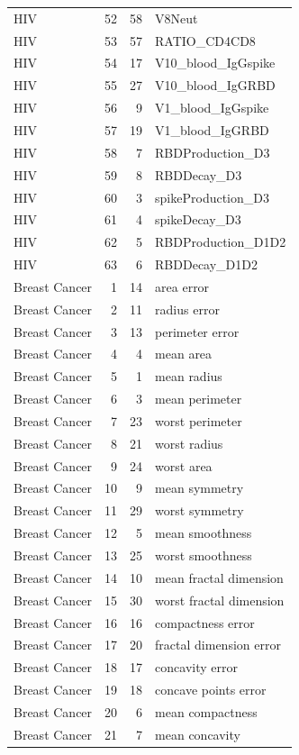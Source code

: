 \begin{longtable}{lrrp{}}
HIV & 52 & 58 & V8Neut \\
HIV & 53 & 57 & RATIO\_CD4CD8 \\
HIV & 54 & 17 & V10\_blood\_IgGspike \\
HIV & 55 & 27 & V10\_blood\_IgGRBD \\
HIV & 56 & 9 & V1\_blood\_IgGspike \\
HIV & 57 & 19 & V1\_blood\_IgGRBD \\
HIV & 58 & 7 & RBDProduction\_D3 \\
HIV & 59 & 8 & RBDDecay\_D3 \\
HIV & 60 & 3 & spikeProduction\_D3 \\
HIV & 61 & 4 & spikeDecay\_D3 \\
HIV & 62 & 5 & RBDProduction\_D1D2 \\
HIV & 63 & 6 & RBDDecay\_D1D2 \\
Breast Cancer & 1 & 14 & area error \\
Breast Cancer & 2 & 11 & radius error \\
Breast Cancer & 3 & 13 & perimeter error \\
Breast Cancer & 4 & 4 & mean area \\
Breast Cancer & 5 & 1 & mean radius \\
Breast Cancer & 6 & 3 & mean perimeter \\
Breast Cancer & 7 & 23 & worst perimeter \\
Breast Cancer & 8 & 21 & worst radius \\
Breast Cancer & 9 & 24 & worst area \\
Breast Cancer & 10 & 9 & mean symmetry \\
Breast Cancer & 11 & 29 & worst symmetry \\
Breast Cancer & 12 & 5 & mean smoothness \\
Breast Cancer & 13 & 25 & worst smoothness \\
Breast Cancer & 14 & 10 & mean fractal dimension \\
Breast Cancer & 15 & 30 & worst fractal dimension \\
Breast Cancer & 16 & 16 & compactness error \\
Breast Cancer & 17 & 20 & fractal dimension error \\
Breast Cancer & 18 & 17 & concavity error \\
Breast Cancer & 19 & 18 & concave points error \\
Breast Cancer & 20 & 6 & mean compactness \\
Breast Cancer & 21 & 7 & mean concavity \\

\end{longtable}
